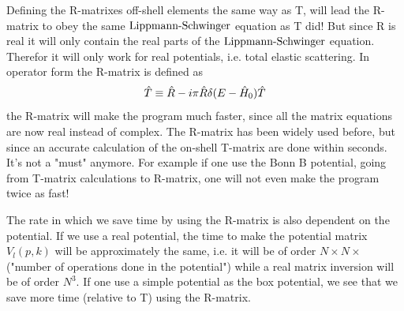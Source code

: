 %
Defining the R-matrixes off-shell elements the same way as T, 
will lead the R-matrix to obey the same $\text{Lippmann-Schwinger}$ equation as T did! But since R is real it will only contain 
the real parts of the $\text{Lippmann-Schwinger}$ equation. Therefor it will only work for real potentials, i.e. total elastic scattering.
%
In operator form the R-matrix is defined as
\begin{equation}\label{eq:R-matrisa}
\op{T}\equiv \op{R}-i\pi \op{R}\delta(E-\op{H}_0)\op{T} %
\end{equation}
%
%
the R-matrix  will make the program much faster, since all the matrix equations are now real instead of complex. The R-matrix
has been widely used  before, but since an accurate calculation of the on-shell 
T-matrix are done within seconds. It's not a "must" anymore.
For example if one use the Bonn B potential, going from 
T-matrix calculations to R-matrix, one will not even make the program twice as fast! 

The rate in which we save time by using the R-matrix is also dependent on the potential. If we use a real potential, the
time to make the potential matrix $V_l(p,k)$ will be approximately the same, i.e.
it will be of order $N\times N\times$ ("number of operations done in
the potential") while a real matrix inversion will be of order $N^3$. If one use a simple potential as the box potential, we see that
we save more time (relative to T) using the R-matrix.

